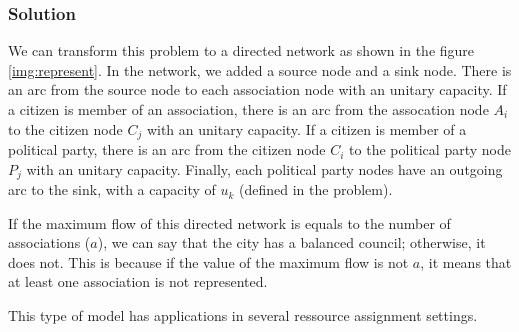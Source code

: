 \subsubsection{Solution}

We can transform this problem to a directed network as shown in the figure \ref{img:represent}. In the network, we added a source node and a sink node. There is an arc from the source node to each association node with an unitary capacity. If a citizen is member of an association, there is an arc from the assocation node $A_i$ to the citizen node $C_j$ with an unitary capacity. If a citizen is member of a political party, there is an arc from the citizen node $C_i$ to the political party node $P_j$ with an unitary capacity. Finally, each political party nodes have an outgoing arc to the sink, with a capacity of $u_k$ (defined in the problem).

If the maximum flow of this directed network is equals to the number of associations ($a$), we can say that the city has a balanced council; otherwise, it does not. This is because if the value of the maximum flow is not $a$, it means that at least one association is not represented.

This type of model has applications in several ressource assignment settings.



